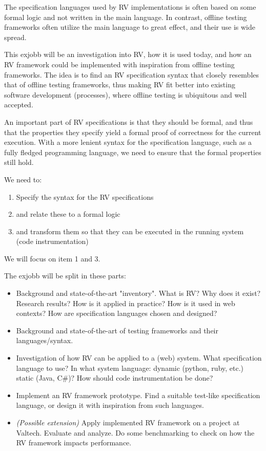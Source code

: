\documentclass[a4paper,11pt]{kth-mag}
\begin{document}
The specification languages used by RV implementations is often based
on some formal logic and not written in the main language. In contrast,
offline testing frameworks often utilize the main language to great effect,
and their use is wide spread.

This exjobb will be an investigation into RV, how it is used today, and how an
RV framework could be implemented with inspiration from offline testing
frameworks. The idea is to find an RV specification syntax that closely
resembles that of offline testing frameworks, thus making RV fit better into
existing software development (processes), where offline testing is ubiquitous
and well accepted.

An important part of RV specifications is that they should be formal, and thus
that the properties they specify yield a formal proof of correctness for the
current execution. With a more lenient syntax for the specification language, such as
a fully fledged programming language, we need to ensure that the formal properties
still hold.

We need to:

\begin{enumerate}
	\item Specify the syntax for the RV specifications
	\item and relate these to a formal logic
	\item and transform them so that they can be executed in the running system
		(code instrumentation)
\end{enumerate}

We will focus on item 1 and 3.

The exjobb will be split in these parts:

\begin{itemize}
	\item Background and state-of-the-art "inventory". What is RV? Why does it
        exist? Research results? How is it applied in practice? How is it used
        in web contexts? How are specification languages chosen and designed?
	\item Background and state-of-the-art of testing frameworks and their
        languages/syntax.
	\item Investigation of how RV can be applied to a (web) system. What
        specification language to use? In what system language: dynamic
        (python, ruby, etc.) static (Java, C\#)? How should code
        instrumentation be done?
	\item Implement an RV framework prototype. Find a suitable test-like
        specification language, or design it with inspiration from such
        languages.
	\item \textit{(Possible extension)}
		Apply implemented RV framework on a project at Valtech. Evaluate and
        analyze. Do some benchmarking to check on how the RV framework impacts
        performance.
\end{itemize}
\end{document}
